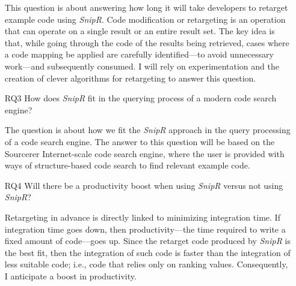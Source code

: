 \begin{itemize}
	This question is about answering how long it will take developers to retarget example code 
	using \emph{SnipR}. Code modification or retargeting is an operation that can operate on a single result 
	or an entire result set. The key idea is that, while going through the code of the results being retrieved, 
	cases where a code mapping be applied are carefully identified---to avoid unnecessary work---and subsequently 
	consumed. I will rely on experimentation and the creation of clever algorithms for retargeting to answer this 
	question.     
	
	
	\item[RQ3] How does \emph{SnipR} fit in the querying process of a modern code search engine?
	
	The question is about how we fit the \emph{SnipR} approach in the query processing of a 
	code search engine. The answer to this question will be based on the Sourcerer\cite{Bajracharya:2006vn} 
	Internet-scale code search engine, where the user is provided with ways of structure-based code search to 
	find relevant example code.
	
	\item[RQ4] Will there be a productivity boost when using \emph{SnipR} versus not using \emph{SnipR}?
	
	Retargeting in advance is directly linked to minimizing integration time. If integration time goes 
	down, then productivity---the time required to write a fixed amount of code---goes up. Since the 
	retarget code produced by \emph{SnipR} is the best fit, then the integration of such code is faster than the 
	integration of less suitable code; i.e., code that relies only on ranking values. Consequently, I anticipate a 
	boost in productivity.
		
\end{itemize}

